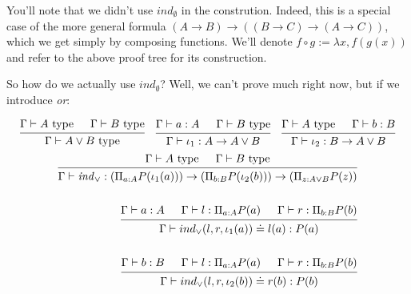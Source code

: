 \documentclass[a4paper, 12pt]{article}
\theoremstyle{changedot}
\theoremstyle{changedotbreak}
\theoremstyle{nonumberplain}
\begin{document}
You'll note that we didn't use $\mathit{ind}_{\emptyset}$ in the constrution. Indeed, this is a special case of the more general formula $(A \to B) \to ((B \to C) \to (A \to C))$, which we get simply by composing functions. We'll denote $f \circ g := \lambda x, f(g(x))$ and refer to the above proof tree for its construction.

So how do we actually use $\mathit{ind}_{\emptyset}$? Well, we can't prove much right now, but if we introduce \textit{or}:

\begin{align*}
  \begin{prooftree}
    \hypo{\Gamma \vdash A \text{ type}}
    \hypo{\Gamma \vdash B \text{ type}}
    \infer2{\Gamma \vdash A \lor B \text{ type}}
  \end{prooftree} & &
  \begin{prooftree}
    \hypo{\Gamma \vdash a : A}
    \hypo{\Gamma \vdash B \text{ type}}
    \infer2{\Gamma \vdash \iota_{1} : A \to A \lor B}
  \end{prooftree}
  &&
  \begin{prooftree}
    \hypo{\Gamma \vdash A \text{ type}}
    \hypo{\Gamma \vdash b : B}
    \infer2{\Gamma \vdash \iota_{2} : B \to A \lor B}
  \end{prooftree}
\end{align*}
\begin{align*}
  \begin{prooftree}
    \hypo{\Gamma \vdash A \text{ type}}
    \hypo{\Gamma \vdash B \text{ type}}
    \infer2{\Gamma \vdash \mathit{ind}_{\lor} : (\Pi_{a:A} P(\iota_{1}(a))) \to (\Pi_{b:B} P(\iota_{2}(b))) \to (\Pi_{z:A\lor B} P(z))}
  \end{prooftree}
  \\ \\
  \begin{prooftree}
    \hypo{\Gamma \vdash a : A}
    \hypo{\Gamma \vdash l : \Pi_{a:A}P(a)}
    \hypo{\Gamma \vdash r : \Pi_{b:B} P(b)}
    \infer3{\Gamma \vdash ind_{\lor}(l, r, \iota_{1}(a)) \doteq l(a) : P(a)}
  \end{prooftree} \\ \\
  \begin{prooftree}
    \hypo{\Gamma \vdash b : B}
    \hypo{\Gamma \vdash l : \Pi_{a:A}P(a)}
    \hypo{\Gamma \vdash r : \Pi_{b:B} P(b)}
    \infer3{\Gamma \vdash ind_{\lor}(l, r, \iota_{2}(b)) \doteq r(b) : P(b)}
  \end{prooftree}
\end{align*}
\end{document}
